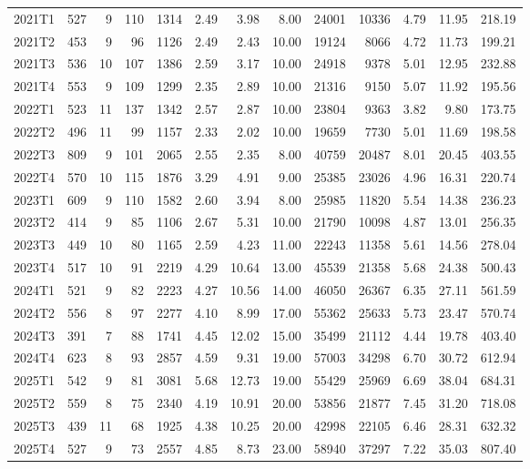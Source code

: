\begin{table}[htbp]
\begin{tabular}{lrrrrrrrrrrrr}
2021T1 & 527 & 9 & 110 & 1314 & 2.49 & 3.98 & 8.00 & 24001 & 10336 & 4.79 & 11.95 & 218.19 \\
2021T2 & 453 & 9 & 96 & 1126 & 2.49 & 2.43 & 10.00 & 19124 & 8066 & 4.72 & 11.73 & 199.21 \\
2021T3 & 536 & 10 & 107 & 1386 & 2.59 & 3.17 & 10.00 & 24918 & 9378 & 5.01 & 12.95 & 232.88 \\
2021T4 & 553 & 9 & 109 & 1299 & 2.35 & 2.89 & 10.00 & 21316 & 9150 & 5.07 & 11.92 & 195.56 \\
2022T1 & 523 & 11 & 137 & 1342 & 2.57 & 2.87 & 10.00 & 23804 & 9363 & 3.82 & 9.80 & 173.75 \\
2022T2 & 496 & 11 & 99 & 1157 & 2.33 & 2.02 & 10.00 & 19659 & 7730 & 5.01 & 11.69 & 198.58 \\
2022T3 & 809 & 9 & 101 & 2065 & 2.55 & 2.35 & 8.00 & 40759 & 20487 & 8.01 & 20.45 & 403.55 \\
2022T4 & 570 & 10 & 115 & 1876 & 3.29 & 4.91 & 9.00 & 25385 & 23026 & 4.96 & 16.31 & 220.74 \\
2023T1 & 609 & 9 & 110 & 1582 & 2.60 & 3.94 & 8.00 & 25985 & 11820 & 5.54 & 14.38 & 236.23 \\
2023T2 & 414 & 9 & 85 & 1106 & 2.67 & 5.31 & 10.00 & 21790 & 10098 & 4.87 & 13.01 & 256.35 \\
2023T3 & 449 & 10 & 80 & 1165 & 2.59 & 4.23 & 11.00 & 22243 & 11358 & 5.61 & 14.56 & 278.04 \\
2023T4 & 517 & 10 & 91 & 2219 & 4.29 & 10.64 & 13.00 & 45539 & 21358 & 5.68 & 24.38 & 500.43 \\
2024T1 & 521 & 9 & 82 & 2223 & 4.27 & 10.56 & 14.00 & 46050 & 26367 & 6.35 & 27.11 & 561.59 \\
2024T2 & 556 & 8 & 97 & 2277 & 4.10 & 8.99 & 17.00 & 55362 & 25633 & 5.73 & 23.47 & 570.74 \\
2024T3 & 391 & 7 & 88 & 1741 & 4.45 & 12.02 & 15.00 & 35499 & 21112 & 4.44 & 19.78 & 403.40 \\
2024T4 & 623 & 8 & 93 & 2857 & 4.59 & 9.31 & 19.00 & 57003 & 34298 & 6.70 & 30.72 & 612.94 \\
2025T1 & 542 & 9 & 81 & 3081 & 5.68 & 12.73 & 19.00 & 55429 & 25969 & 6.69 & 38.04 & 684.31 \\
2025T2 & 559 & 8 & 75 & 2340 & 4.19 & 10.91 & 20.00 & 53856 & 21877 & 7.45 & 31.20 & 718.08 \\
2025T3 & 439 & 11 & 68 & 1925 & 4.38 & 10.25 & 20.00 & 42998 & 22105 & 6.46 & 28.31 & 632.32 \\
2025T4 & 527 & 9 & 73 & 2557 & 4.85 & 8.73 & 23.00 & 58940 & 37297 & 7.22 & 35.03 & 807.40 \\
\bottomrule
\end{tabular}
\end{table}
